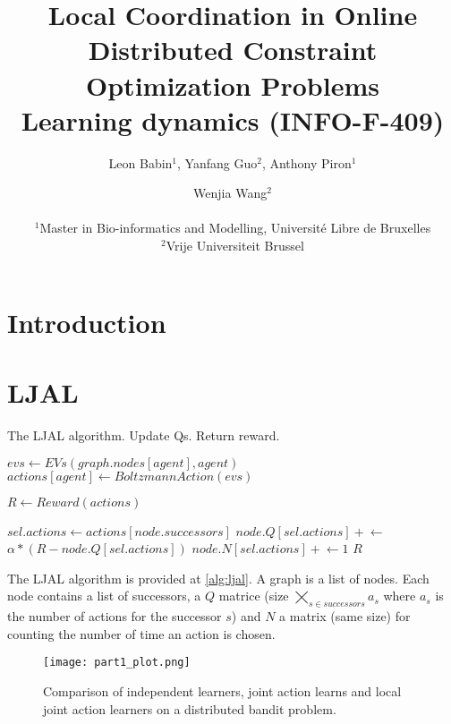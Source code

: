\documentclass[a4paper, 12pt]{article}
\title{Local Coordination in Online Distributed Constraint Optimization Problems \citep{Brys2012} \\ \large Learning dynamics (INFO-F-409)}
\author{Leon Babin$^1$, Yanfang Guo$^2$, Anthony Piron$^1$ \and Wenjia Wang$^2$ \\
\mbox{}\\
$^1$Master in Bio-informatics and Modelling, Université Libre de Bruxelles \\
$^2$Vrije Universiteit Brussel}
\begin{document}
\maketitle

\begin{abstract}
  
\end{abstract}

\section{Introduction}


\section{LJAL}

\begin{algorithm}[tph]
  \caption{The LJAL algorithm. Update Qs. Return reward.}
  \label{alg:ljal}
  \begin{algorithmic}
    \State $evs\gets EVs(graph.nodes[agent], agent)$
    \State $actions[agent]\gets BoltzmannAction(evs)$
    \EndFor

    \State $R\gets Reward(actions)$

    \State $sel.actions\gets actions[node.successors]$
    \State $node.Q[sel.actions] \mathrel{+}\gets$
    \State \hspace{1cm}$\alpha * (R - node.Q[sel.actions])$
    \State $node.N[sel.actions]\mathrel{+}\gets 1$
    \EndFor
    \Return $R$
    \EndFunction
    \State
    \State {}
    \EndFor
  \end{algorithmic}
\end{algorithm}

The LJAL algorithm is provided at \ref{alg:ljal}. A graph is a list of nodes. Each node contains a list of successors, a $Q$ matrice (size $\bigtimes_{s \in successors} a_s$ where $a_s$ is the number of actions for the successor $s$) and $N$ a matrix (same size) for counting the number of time an action is chosen. 

\begin{figure*}[tp]
  \centering
  \texttt{[image: part1\_plot.png]}
  \caption{Comparison of independent learners, joint action learns and local joint action learners on a distributed bandit problem.}
  \label{fig:part1}
\end{figure*}
\end{document}
